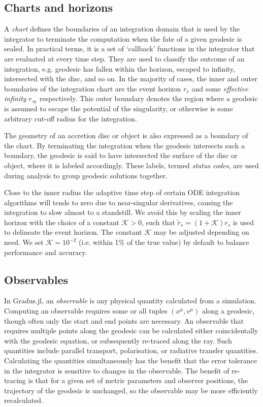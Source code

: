 \documentclass[fleqn,usenatbib]{mnras}
\newcommand{\Gradus}{Gradus.jl\xspace}
\begin{document}
\subsection{Charts and horizons}

A \emph{chart} defines the boundaries of an integration domain that is used by
the integrator to terminate the computation when the fate of a given geodesic is
sealed. In practical terms, it is a set of `callback' functions in the
integrator that are evaluated at every time step. They are used to classify the
outcome of an integration, e.g. geodesic has fallen within the horizon, escaped
to infinity, intersected with the disc, and so on. In the majority of cases, the
inner and outer boundaries of the integration chart are the event horizon $r_s$
and some \emph{effective infinity} $r_\infty$ respectively. This outer boundary
denotes the region where a geodesic is assumed to escape the potential of the
singularity, or otherwise is some arbitrary cut-off radius for the integration.

The geometry of an accretion disc or object is also expressed as a boundary of
the chart. By terminating the integration when the geodesic intersects such a
boundary, the geodesic is said to have intersected the surface of the disc or
object, where it is labeled accordingly. These labels, termed \emph{status
codes}, are used during analysis to group geodesic solutions together.

Close to the inner radius the adaptive time step of certain ODE integration
algorithms will tends to zero due to near-singular derivatives, causing the
integration to slow almost to a standstill. We avoid this by scaling the inner
horizon with the choice of a constant $\mathcal{K} > 0$, such that $\tilde{r}_s
= (1 + \mathcal{K}) r_s$ is used to delineate the event horizon.  The constant
$\mathcal{K}$ may be adjusted depending on need. We set $\mathcal{K} = 10^{-2}$
(i.e. within 1\% of the true value) by default to balance performance and
accuracy.

\subsection{Observables}
\label{sec:computing-observables}

In \Gradus, an \textit{observable} is any physical quantity calculated from a
simulation. Computing an observable requires some or all tuples $(x^\mu, v^\mu)$
along a geodesic, though often only the start and end points are necessary. An
observable that requires multiple points along the geodesic can be calculated
either coincidentally with the geodesic equation, or subsequently re-traced
along the ray. Such quantities include parallel transport, polarisation, or
radiative transfer quantities.  Calculating the quantities simultaneously has
the benefit that the error tolerance in the integrator is sensitive to changes
in the observable. The benefit of re-tracing is that for a given set of metric
parameters and observer positions, the trajectory of the geodesic is unchanged,
so the observable may be more efficiently recalculated.
\end{document}
